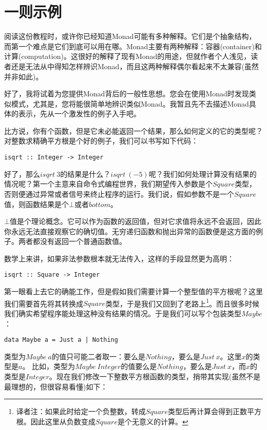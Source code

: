 \section{一则示例}

阅读这份教程时，或许你已经知道Monad可能有多种解释。它们是个抽象结构，而第一个难点是它们到底可以用在哪。Monad主要有两种解释：容器(container)和计算(computation)。这很好的解释了现有Monad的用途，但就作者个人浅见，读者还是无法从中得知怎样辨识Monad，而且这两种解释偶尔看起来不太兼容(虽然并非如此)。

好了，我将试着为您提供Monad背后的一般性思想。您会在使用Monad时发现类似模式，尤其是，您将能很简单地辨识类似Monad。我暂且先不去描述Monad具体的表示，先从一个激发性的例子入手吧。

比方说，你有个函数，但是它未必能返回一个结果，那么如何定义的它的类型呢？对整数求精确平方根是个好的例子，我们可以书写如下代码：

\begin{lstlisting}
isqrt :: Integer -> Integer
\end{lstlisting}

好了，那么$isqrt\ 3$的结果是什么？$isqrt\ (-5)$呢？我们如何处理计算没有结果的情况呢？第一个主意来自命令式编程世界，我们期望传入参数是个$Square$类型，否则便通过异常或者信号来终止程序的运行。我们说，假如参数不是一个$Square$值，则函数结果是个$\bot$或者$bottom$。

$\bot$值是个理论概念。它可以作为函数的返回值，但对它求值将永远不会返回，因此你永远无法直接观察它的确切值。无穷递归函数和抛出异常的函数便是这方面的例子。两者都没有返回一个普通函数值。

数学上来讲，如果非法参数根本就无法传入，这样的手段显然更为高明：

\begin{lstlisting}
isqrt :: Square -> Integer
\end{lstlisting}

第一眼看上去它的确能工作，但是假如我们需要计算一个整型值的平方根呢？这里我们需要首先将其转换成$Square$类型，于是我们又回到了老路上\footnote{译者注：如果此时给定一个负整数，转成$Square$类型后再计算会得到正数平方根。因此这里从负数变成$Square$是个无意义的计算。}。而且很多时候我们确实希望程序能处理这种没有结果的情况。于是我们可以写个包装类型$Maybe$：

\begin{lstlisting}
data Maybe a = Just a | Nothing
\end{lstlisting}

类型为$Maybe\ a$的值只可能二者取一：要么是$Nothing$，要么是$Just\ x$。这里$x$的类型是$a$。 比如，类型为$Maybe\ Integer$的值要么是$Nothing$，要么是$Just\ x$，而$x$的类型是$Integer$。现在我们修改一下整数平方根函数的类型，捎带其实现(虽然不是最理想的，但很容易看懂)如下：

